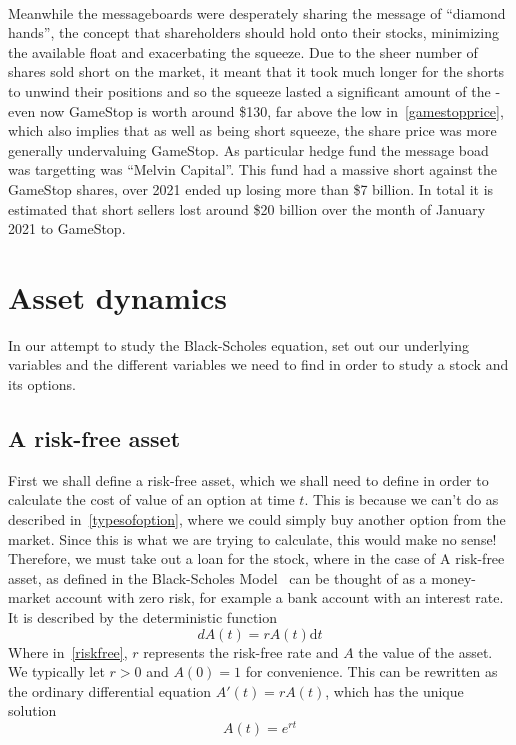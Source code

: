 \documentclass[11pt]{article} %
\begin{document}
\paragraph{}
Meanwhile the messageboards were desperately sharing the message of ``diamond hands'', 
the concept that shareholders should hold onto their stocks, minimizing the available 
float and exacerbating the squeeze. Due to the sheer number of shares sold short on 
the market, it meant that it took much longer for the shorts to unwind their positions 
and so the squeeze lasted a significant amount of the - even now GameStop is worth 
around \$130, far above the low in~\ref{gamestopprice}, which also implies that 
as well as being short squeeze, the share price was more generally undervaluing GameStop.
As particular hedge fund the message boad was targetting was ``Melvin Capital''. This 
fund had a massive short against the GameStop shares, over 2021 ended up losing more 
than \$7 billion. In total it is estimated that short sellers lost around \$20 billion 
over the month of January 2021 to GameStop.

\section{Asset dynamics}\label{assetdyamics}
In our attempt to study the Black-Scholes equation, set out our underlying variables 
and the different variables we need to find in order to study a stock and its options.

\subsection{A risk-free asset}
First we shall define a risk-free asset, which we shall need to define in order to 
calculate the cost of value of an option at time $t$. This is because we can't do 
as described in~\ref{typesofoption}, where we could simply buy another option from the 
market. Since this is what we are trying to calculate, this would make no sense! Therefore, 
we must take out a loan for the stock, where in the case of 
A risk-free asset, as defined in the Black-Scholes Model~\cite{blackscholes} can be thought
of as a money-market account with zero risk, for example a bank account with an interest 
rate. It is described by the deterministic function 
\begin{equation} \label{riskfree}
    dA(t) = rA(t)\mathrm{d}t 
\end{equation}
Where in~\eqref{riskfree}, $r$ represents the risk-free rate and $A$ the value of the 
asset. We typically let $r>0$ and $A(0) = 1$ for convenience. This can be rewritten as 
the ordinary differential equation $A'(t) = rA(t)$, which has the unique solution 
\begin{equation} \label{riskfree solution}
    A(t) =e^{rt}
\end{equation}
\end{document}
